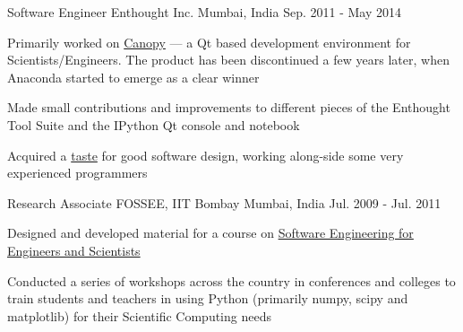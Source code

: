 \begin{cventries}
  \cventry
    {Software Engineer} %
    {Enthought Inc. } %
    {Mumbai, India} %
    {Sep. 2011 - May 2014} %
    {
      \begin{cvitems} %
        \item {Primarily worked on \href{https://web.archive.org/web/20170621202502/https://www.enthought.com/products/canopy/}{Canopy} --- a Qt based development environment for Scientists/Engineers. The product has been discontinued a few years later, when Anaconda started to emerge as a clear winner}
        \item {Made small contributions and improvements to different pieces of the Enthought Tool Suite and the IPython Qt console and notebook}
        \item {Acquired a \href{https://rawgit.com/punchagan/340e1350fdfc766c6599/raw/ca1f5fe9bfc1cc503cd8a524e350bd29e8f5f33d/month-with-martin.html}{taste} for good software design, working along-side some very experienced programmers}
      \end{cvitems}
    }

  \cventry
    {Research Associate} %
    {FOSSEE, IIT Bombay } %
    {Mumbai, India} %
    {Jul. 2009 - Jul. 2011} %
    {
      \begin{cvitems} %
        \item {Designed and developed material for a course on \href{https://github.com/FOSSEE/sees}{Software Engineering for Engineers and Scientists}}
        \item {Conducted a series of workshops across the country in conferences and colleges to train students and teachers in using Python (primarily numpy, scipy and matplotlib) for their Scientific Computing needs}
      \end{cvitems}
    }

\end{cventries}
